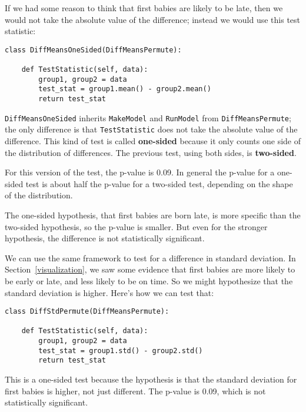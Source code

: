 If we had some reason to think that first babies are likely
to be late, then we would not take the absolute value of the difference;
instead we would use this test statistic:

\begin{verbatim}
class DiffMeansOneSided(DiffMeansPermute):

    def TestStatistic(self, data):
        group1, group2 = data
        test_stat = group1.mean() - group2.mean()
        return test_stat
\end{verbatim}

{\tt DiffMeansOneSided} inherits {\tt MakeModel} and {\tt RunModel}
from {\tt DiffMeansPermute}; the only difference is that
{\tt TestStatistic} does not take the absolute value of the
difference.  This kind of test is called {\bf one-sided} because
it only counts one side of the distribution of differences.  The
previous test, using both sides, is {\bf two-sided}.

For this version of the test, the p-value is 0.09.  In general
the p-value for a one-sided test is about half the p-value for
a two-sided test, depending on the shape of the distribution.

The one-sided hypothesis, that first babies are born late, is more
specific than the two-sided hypothesis, so the p-value is smaller.
But even for the stronger hypothesis, the difference is
not statistically significant.
   

We can use the same framework to test for a difference in standard
deviation.  In Section~\ref{visualization}, we saw some evidence that
first babies are more likely to be early or late, and less likely to
be on time.  So we might hypothesize that the standard deviation is
higher.  Here's how we can test that:

\begin{verbatim}
class DiffStdPermute(DiffMeansPermute):

    def TestStatistic(self, data):
        group1, group2 = data
        test_stat = group1.std() - group2.std()
        return test_stat
\end{verbatim}

This is a one-sided test because the hypothesis is that the standard
deviation for first babies is higher, not just different.  The p-value
is 0.09, which is not statistically significant.
   


